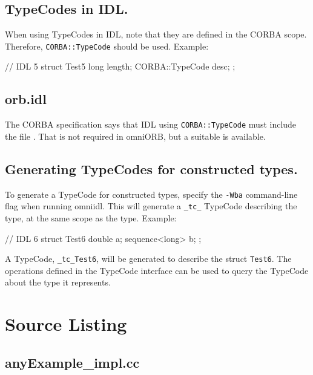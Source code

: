\documentclass[11pt,twoside,a4paper]{book}
\newcommand{\type}[1]{\texttt{#1}}
\newcommand{\code}[1]{\texttt{#1}}
\newcommand{\file}{\begingroup \urlstyle{tt}\Url}
\begin{document}
\subsection{TypeCodes in IDL.}

When using TypeCodes in IDL, note that they are defined in the CORBA
scope.  Therefore, \type{CORBA::TypeCode} should be used. Example:

\begin{idllisting}
// IDL 5
struct Test5 {
  long length;
  CORBA::TypeCode desc;
};
\end{idllisting}

\subsection{orb.idl}

The CORBA specification says that IDL using \type{CORBA::TypeCode}
must include the file \file{orb.idl}. That is not required in omniORB,
but a suitable \file{orb.idl} is available.


\subsection{Generating TypeCodes for constructed types.}

To generate a TypeCode for constructed types, specify the
\texttt{-Wba} command-line flag when running omniidl. This will
generate a \code{\_tc\_} TypeCode describing the type, at the same
scope as the type. Example:

\begin{idllisting}
// IDL 6
struct Test6 {
  double a;
  sequence<long> b;
};
\end{idllisting}

A TypeCode, \code{\_tc\_Test6}, will be generated to describe the
struct \type{Test6}. The operations defined in the TypeCode interface
can be used to query the TypeCode about the type it represents.




\clearpage

\section{Source Listing}

\subsection{anyExample\_impl.cc}
\end{document}

